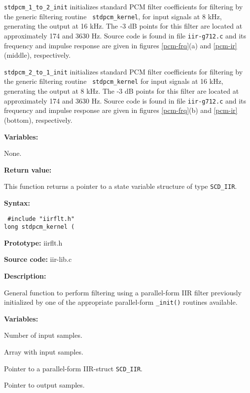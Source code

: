 {\tt stdpcm\_1\_to\_2\_init} initializes standard PCM filter
coefficients for filtering by the generic filtering routine {\tt
stdpcm\_kernel}, for input signals at 8 kHz, generating the output at
16 kHz. The -3 dB points for this filter are located at approximately
174 and 3630 Hz. Source code is found in file {\tt iir-g712.c} and its
frequency and impulse response are given in figures \ref{pcm-frq}(a)
and \ref{pcm-ir} (middle), respectively.

{\tt stdpcm\_2\_to\_1\_init} initializes standard PCM filter
coefficients for filtering by the generic filtering routine {\tt
stdpcm\_kernel} for input signals at 16 kHz, generating the output at
8 kHz. The -3 dB points for this filter are located at approximately
174 and 3630 Hz. Source code is found in file {\tt iir-g712.c} and its
frequency and impulse response are given in figures \ref{pcm-frq}(b)
and \ref{pcm-ir} (bottom), respectively.

{\bf Variables: }

None.

{\bf Return value: }

This function returns a pointer to a state variable structure of type
{\tt SCD\_IIR}.




{\bf Syntax: }

{\tt
\#include "iirflt.h"\\
long stdpcm\_kernel (
}

{\bf Prototype: }    iirflt.h

{\bf Source code: }  iir-lib.c

{\bf Description: }

General function to perform filtering using a parallel-form
IIR  filter previously initialized by one of the appropriate parallel-form
{\tt *\_init()} routines available.

{\bf Variables: }
\begin{Descr}{\DescrLen}
\item[\pbox{20mm}{\em lseg}] %
        Number of input samples.

\item[\pbox{20mm}{\em x\_ptr}] %
        Array with input samples.

\item[\pbox{20mm}{\em iir\_ptr}] %
        Pointer to a parallel-form IIR-struct {\tt SCD\_IIR}.

\item[\pbox{20mm}{\em y\_ptr}] %
        Pointer to output samples.
\end{Descr}


